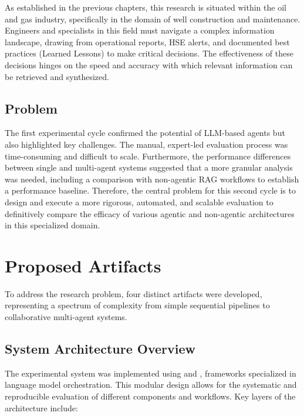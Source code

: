     As established in the previous chapters, this research is situated within the oil and gas industry, specifically in the domain of well construction and maintenance. Engineers and specialists in this field must navigate a complex information landscape, drawing from operational reports, HSE alerts, and documented best practices (Learned Lessons) to make critical decisions. The effectiveness of these decisions hinges on the speed and accuracy with which relevant information can be retrieved and synthesized.

    \subsection{Problem}

    The first experimental cycle confirmed the potential of LLM-based agents but also highlighted key challenges. The manual, expert-led evaluation process was time-consuming and difficult to scale. Furthermore, the performance differences between single and multi-agent systems suggested that a more granular analysis was needed, including a comparison with non-agentic RAG workflows to establish a performance baseline. Therefore, the central problem for this second cycle is to design and execute a more rigorous, automated, and scalable evaluation to definitively compare the efficacy of various agentic and non-agentic architectures in this specialized domain.


\section{Proposed Artifacts}

    To address the research problem, four distinct artifacts were developed, representing a spectrum of complexity from simple sequential pipelines to collaborative multi-agent systems. 
    
    \subsection{System Architecture Overview}

    The experimental system was implemented using \citet{Langchain2025} and \citet{Langgraph2025}, frameworks specialized in language model orchestration. This modular design allows for the systematic and reproducible evaluation of different components and workflows. Key layers of the architecture include:

